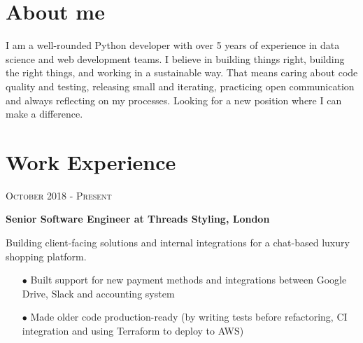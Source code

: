 \documentclass[10pt]{article} %
\begin{document}
\begin{minipage}[t]{0.5\textwidth} %
\vspace{0pt} %
	



\section{About me} 


\normalsize{I am a well-rounded Python developer with over 5 years of experience in data science and web development teams. I believe in building things right, building the right things, and working in a sustainable way. That means caring about code quality and testing, releasing small and iterating, practicing open communication and always reflecting on my processes. Looking for a new position where I can make a difference.}
	



\section{Work Experience} 

{\raggedleft\textsc{October 2018 - Present}\par}

{\raggedright\large \textbf{Senior Software Engineer at Threads Styling, London}\\
}

\normalsize{Building client-facing solutions and internal integrations for a chat-based luxury shopping platform.}
\begin{itemize}
\item[$\bullet$] Built support for new payment methods and integrations between Google Drive, Slack and accounting system
\item[$\bullet$] Made older code production-ready (by writing tests before refactoring, CI integration and using Terraform to deploy to AWS)
\end{itemize}


\end{minipage}
\end{document}

